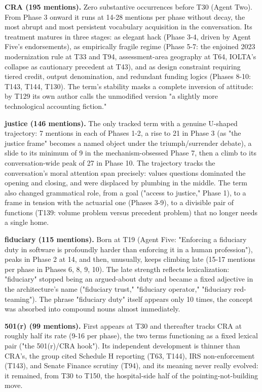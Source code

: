 \documentclass[sigconf,nonacm=true]{acmart}
\begin{document}
\textbf{CRA (195 mentions).} Zero substantive occurrences before T30 (Agent Two). From Phase 3 onward it runs at 14-28 mentions per phase without decay,  the most abrupt and most persistent vocabulary acquisition in the conversation. Its treatment matures in three stages: as elegant hack (Phase 3-4, driven by Agent Five's endorsements), as empirically fragile regime (Phase 5-7: the enjoined 2023 modernization rule at T33 and T94, assessment-area geography at T64, IOLTA's collapse as cautionary precedent at T43), and as design constraint requiring tiered credit, output denomination, and redundant funding logics (Phases 8-10: T143, T144, T130). The term's stability masks a complete inversion of attitude: by T129 its own author calls the unmodified version "a slightly more technological accounting fiction."

\textbf{justice (146 mentions).} The only tracked term with a genuine U-shaped trajectory: 7 mentions in each of Phases 1-2, a rise to 21 in Phase 3 (as "the justice frame" becomes a named object under the triumph/surrender debate), a slide to its minimum of 9 in the mechanism-obsessed Phase 7, then a climb to its conversation-wide peak of 27 in Phase 10. The trajectory tracks the conversation's moral attention span precisely: values questions dominated the opening and closing, and were displaced by plumbing in the middle. The term also changed grammatical role,  from a goal ("access to justice," Phase 1), to a frame in tension with the actuarial one (Phases 3-9), to a divisible pair of functions (T139: volume problem versus precedent problem) that no longer needs a single home.

\textbf{fiduciary (115 mentions).} Born at T19 (Agent Five: "Enforcing a fiduciary duty in software is profoundly harder than enforcing it in a human profession"), peaks in Phase 2 at 14, and then,  unusually,  keeps climbing late (15-17 mentions per phase in Phases 6, 8, 9, 10). The late strength reflects lexicalization: "fiduciary" stopped being an argued-about duty and became a fixed adjective in the architecture's name ("fiduciary trust," "fiduciary operator," "fiduciary red-teaming"). The phrase "fiduciary duty" itself appears only 10 times,  the concept was absorbed into compound nouns almost immediately.

\textbf{501(r) (99 mentions).} First appears at T30 and thereafter tracks CRA at roughly half its rate (9-16 per phase), the two terms functioning as a fixed lexical pair ("the 501(r)/CRA hook"). Its independent development is thinner than CRA's,  the group cited Schedule H reporting (T63, T144), IRS non-enforcement (T143), and Senate Finance scrutiny (T94),  and its meaning never really evolved: it remained, from T30 to T150, the hospital-side half of the pointing-not-building move.
\end{document}
